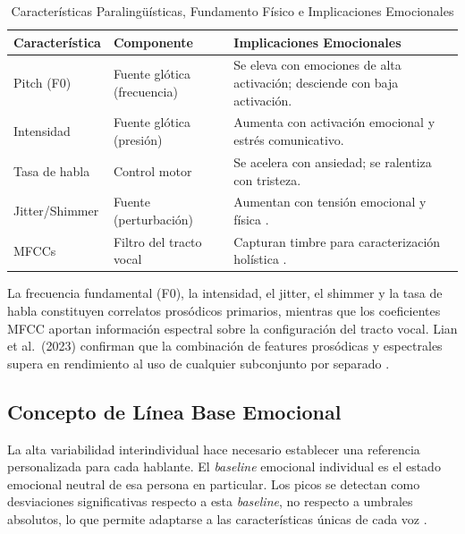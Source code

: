 \begin{table}[!t]
\renewcommand{\arraystretch}{1.3}
\caption{Características Paralingüísticas, Fundamento Físico e Implicaciones Emocionales}
\label{tab:paralinguistic}
\centering
\begin{tabular}{p{1.6cm} p{2.0cm} p{3.8cm}}
\toprule
\textbf{Característica} & \textbf{Componente} & \textbf{Implicaciones Emocionales} \\
\midrule
Pitch (F0)       & Fuente glótica (frecuencia) & Se eleva con emociones de alta activación; desciende con baja activación. \\
Intensidad       & Fuente glótica (presión)     & Aumenta con activación emocional y estrés comunicativo. \\
Tasa de habla    & Control motor               & Se acelera con ansiedad; se ralentiza con tristeza. \\
Jitter/Shimmer   & Fuente (perturbación)        & Aumentan con tensión emocional y física \cite{zhang2023}. \\
MFCCs            & Filtro del tracto vocal      & Capturan timbre para caracterización holística \cite{jha2022}. \\
\bottomrule
\end{tabular}
\end{table}

La frecuencia fundamental (F0), la intensidad, el jitter, el shimmer y la tasa de
habla constituyen correlatos prosódicos primarios, mientras que los coeficientes
MFCC aportan información espectral sobre la configuración del tracto vocal. Lian
et al.\ (2023) confirman que la combinación de features prosódicas y espectrales
supera en rendimiento al uso de cualquier subconjunto por separado \cite{lian2023}.

\subsection{Concepto de Línea Base Emocional}
\label{sec:rt_baseline}

La alta variabilidad interindividual hace necesario establecer una referencia
personalizada para cada hablante. El \textit{baseline} emocional individual es el
estado emocional neutral de esa persona en particular. Los picos se detectan como
desviaciones significativas respecto a esta \textit{baseline}, no respecto a umbrales
absolutos, lo que permite adaptarse a las características únicas de cada voz
\cite{gat2022}.

